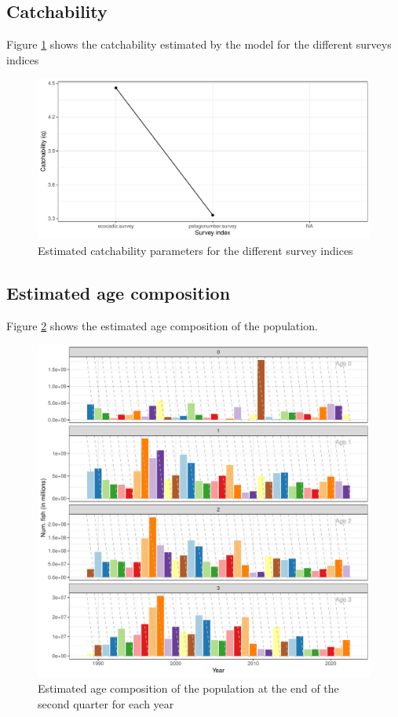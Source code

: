 \documentclass[review]{elsarticle}
\begin{document}
\subsection{Catchability}

Figure \ref{catchability} shows the catchability estimated by the model for the different surveys indices

\begin{figure}[h!]
 \centering
 \includegraphics[bb=0 0 595 288]{./catchability.pdf}
 \caption{Estimated catchability parameters for the different survey indices}
 \label{catchability}
\end{figure}

\subsection{Estimated age composition}

Figure \ref{cohortevol} shows the estimated age composition of the population.
\begin{figure}[h!]
 \centering
 \includegraphics{./cohortevol.pdf}
 \caption{Estimated age composition of the population at the end of the second quarter for each year}
 \label{cohortevol}
\end{figure}
\end{document}
